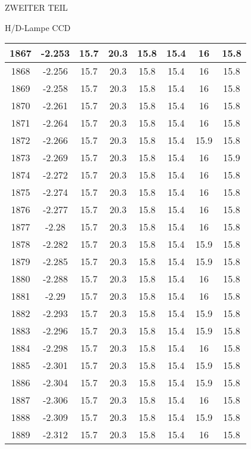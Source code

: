\begin{appendix}
\begin{chapter}{ZWEITER TEIL}
\begin{section}{H/D-Lampe CCD}
\begin{scriptsize}
\begin{longtable}[htbp]{|c|c|c|c|c|c|c|c|}
            1867 & -2.253 & 15.7 & 20.3 & 15.8 & 15.4 & 16 & 15.8 \\ \hline
            1868 & -2.256 & 15.7 & 20.3 & 15.8 & 15.4 & 16 & 15.8 \\ \hline
            1869 & -2.258 & 15.7 & 20.3 & 15.8 & 15.4 & 16 & 15.8 \\ \hline
            1870 & -2.261 & 15.7 & 20.3 & 15.8 & 15.4 & 16 & 15.8 \\ \hline
            1871 & -2.264 & 15.7 & 20.3 & 15.8 & 15.4 & 16 & 15.8 \\ \hline
            1872 & -2.266 & 15.7 & 20.3 & 15.8 & 15.4 & 15.9 & 15.8 \\ \hline
            1873 & -2.269 & 15.7 & 20.3 & 15.8 & 15.4 & 16 & 15.9 \\ \hline
            1874 & -2.272 & 15.7 & 20.3 & 15.8 & 15.4 & 16 & 15.8 \\ \hline
            1875 & -2.274 & 15.7 & 20.3 & 15.8 & 15.4 & 16 & 15.8 \\ \hline
            1876 & -2.277 & 15.7 & 20.3 & 15.8 & 15.4 & 16 & 15.8 \\ \hline
            1877 & -2.28 & 15.7 & 20.3 & 15.8 & 15.4 & 16 & 15.8 \\ \hline
            1878 & -2.282 & 15.7 & 20.3 & 15.8 & 15.4 & 15.9 & 15.8 \\ \hline
            1879 & -2.285 & 15.7 & 20.3 & 15.8 & 15.4 & 15.9 & 15.8 \\ \hline
            1880 & -2.288 & 15.7 & 20.3 & 15.8 & 15.4 & 16 & 15.8 \\ \hline
            1881 & -2.29 & 15.7 & 20.3 & 15.8 & 15.4 & 16 & 15.8 \\ \hline
            1882 & -2.293 & 15.7 & 20.3 & 15.8 & 15.4 & 15.9 & 15.8 \\ \hline
            1883 & -2.296 & 15.7 & 20.3 & 15.8 & 15.4 & 15.9 & 15.8 \\ \hline
            1884 & -2.298 & 15.7 & 20.3 & 15.8 & 15.4 & 16 & 15.8 \\ \hline
            1885 & -2.301 & 15.7 & 20.3 & 15.8 & 15.4 & 15.9 & 15.8 \\ \hline
            1886 & -2.304 & 15.7 & 20.3 & 15.8 & 15.4 & 15.9 & 15.8 \\ \hline
            1887 & -2.306 & 15.7 & 20.3 & 15.8 & 15.4 & 16 & 15.8 \\ \hline
            1888 & -2.309 & 15.7 & 20.3 & 15.8 & 15.4 & 15.9 & 15.8 \\ \hline
            1889 & -2.312 & 15.7 & 20.3 & 15.8 & 15.4 & 16 & 15.8 \\ \hline

\end{longtable}
\end{scriptsize}
\end{section}
\end{chapter}
\end{appendix}
